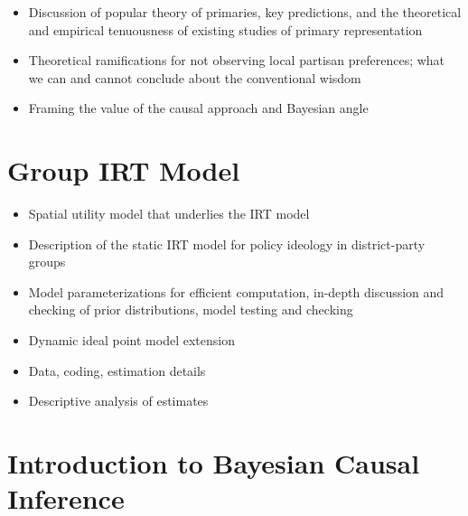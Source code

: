 \documentclass[12pt
              ]{article}
\begin{document}
\begin{itemize}
  \item Discussion of popular theory of primaries, key predictions, and the theoretical and empirical tenuousness of existing studies of primary representation
  \item Theoretical ramifications for not observing local partisan preferences; what we can and cannot conclude about the conventional wisdom
  \item Framing the value of the causal approach and Bayesian angle
\end{itemize}

\section{Group IRT Model}

\begin{itemize}
  \item Spatial utility model that underlies the IRT model
  \item Description of the static IRT model for policy ideology in district-party groups
  \item Model parameterizations for efficient computation, in-depth discussion and checking of prior distributions, model testing and checking
  \item Dynamic ideal point model extension
  \item Data, coding, estimation details
  \item Descriptive analysis of estimates
\end{itemize}


\section{Introduction to Bayesian Causal Inference}
\end{document}
